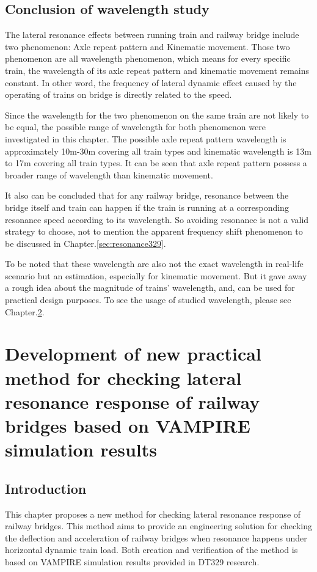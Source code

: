 \section{Conclusion of wavelength study}

The lateral resonance effects between running train and railway bridge include two phenomenon: Axle repeat pattern and Kinematic movement. Those two phenomenon are all wavelength phenomenon, which means for every specific train, the wavelength of its axle repeat pattern and kinematic movement remains constant. In other word, the frequency of lateral dynamic effect caused by the operating of trains on bridge is directly related to the speed.

Since the wavelength for the two phenomenon on the same train are not likely to be equal, the possible range of wavelength for both phenomenon were investigated in this chapter. The possible axle repeat pattern wavelength is approximately 10m-30m covering all train types and kinematic wavelength is 13m to 17m covering all train types. It can be seen that axle repeat pattern possess a broader range of wavelength than kinematic movement.

It also can be concluded that for any railway bridge, resonance between the bridge itself and train can happen if the train is running at a corresponding resonance speed according to its wavelength. So avoiding resonance is not a valid strategy to choose, not to mention the apparent frequency shift phenomenon to be discussed in Chapter.\ref{sec:resonance329}. 

To be noted that these wavelength are also not the exact wavelength in real-life scenario but an estimation, especially for kinematic movement. But it gave away a rough idea about the magnitude of trains' wavelength, and, can be used for practical design purposes. To see the usage of studied wavelength, please see Chapter.\ref{sec:parcticalmethod}.

\chapter{Development of new practical method for checking lateral resonance response of railway bridges based on VAMPIRE simulation results }\label{sec:parcticalmethod}

\section{Introduction}

This chapter proposes a new method for checking lateral resonance response of railway bridges. This method aims to provide an engineering solution for checking the deflection and acceleration of railway bridges when resonance happens under horizontal dynamic train load. Both creation and verification of the method is based on VAMPIRE simulation results provided in DT329 research.

